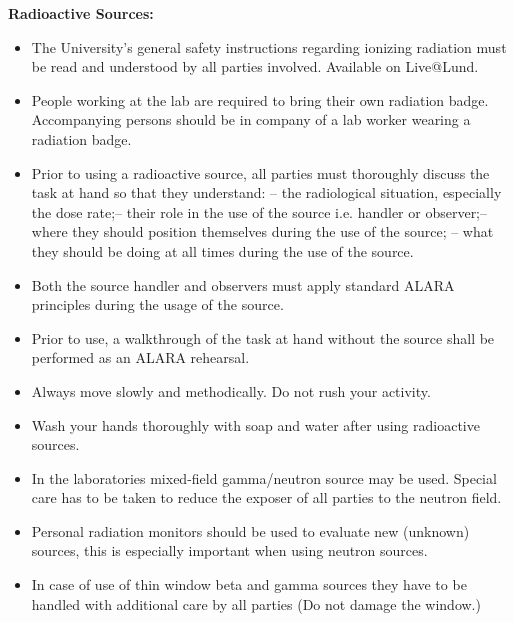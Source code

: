\documentclass[11pt]{article}
\begin{document}
{\bf Radioactive Sources:}
\begin{itemize}
\item The University’s general safety instructions regarding ionizing
  radiation must be read and understood by all parties involved.
   Available on Live@Lund.
\item People working at the lab are required to bring their own
  radiation badge. Accompanying persons should be in company of a lab
  worker wearing a radiation badge.
\item Prior to using a radioactive source, all parties must thoroughly
  discuss the task at hand so that they understand: – the radiological
  situation, especially the dose rate;– their role in the use of the
  source i.e. handler or observer;– where they should position
  themselves during the use of the source; – what they should be doing
  at all times during the use of the source.
\item Both the source handler and observers must apply standard ALARA
  principles during the usage of the source.
\item Prior to use, a walkthrough of the task at hand without the
  source shall be performed as an ALARA rehearsal.
\item Always move slowly and methodically. Do not rush your activity.
\item Wash your hands thoroughly with soap and water after using
  radioactive sources.
\item In the laboratories mixed-field gamma/neutron source may be
  used.  Special care has to be taken to reduce the exposer of all
  parties to the neutron field.
\item Personal radiation monitors should be used to evaluate new
  (unknown) sources, this is especially important when using neutron
  sources.
\item In case of use of thin window beta and gamma sources they have
  to be handled with additional care by all parties (Do not damage
  the window.)
\end{itemize}
\end{document}
